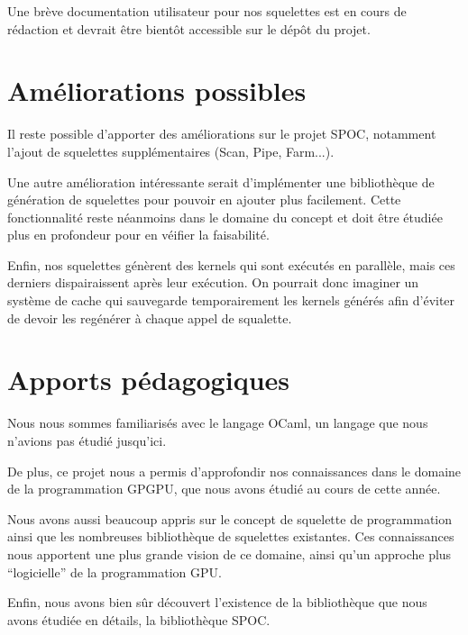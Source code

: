 \documentclass{report}
\begin{document}
Une brève documentation utilisateur pour nos squelettes est en cours de rédaction et devrait être bientôt accessible sur le dépôt du projet.\newline

\section{Améliorations possibles}
Il reste possible d'apporter des améliorations sur le projet SPOC, notamment l'ajout de squelettes supplémentaires (Scan, Pipe, Farm...).\newline

Une autre amélioration intéressante serait d'implémenter une bibliothèque de génération de squelettes pour pouvoir en ajouter plus facilement. Cette fonctionnalité reste néanmoins dans le domaine du concept et doit être étudiée plus en profondeur pour en véifier la faisabilité.\newline

Enfin, nos squelettes génèrent des kernels qui sont exécutés en parallèle, mais ces derniers dispairaissent après leur exécution. On pourrait donc imaginer un système de cache qui sauvegarde temporairement les kernels générés afin d'éviter de devoir les regénérer à chaque appel de squalette.\newline

\section{Apports pédagogiques}
Nous nous sommes familiarisés avec le langage OCaml, un langage que nous n'avions pas étudié jusqu'ici.\newline

De plus, ce projet nous a permis d'approfondir nos connaissances dans le domaine de la programmation GPGPU, que nous avons étudié au cours de cette année. \newline

Nous avons aussi beaucoup appris sur le concept de squelette de programmation ainsi que les nombreuses bibliothèque de squelettes existantes. Ces connaissances nous apportent une plus grande vision de ce domaine, ainsi qu'un approche plus ``logicielle'' de la programmation GPU.\newline

Enfin, nous avons bien sûr découvert l'existence de la bibliothèque que nous avons étudiée en détails, la bibliothèque SPOC.



\end{document}

